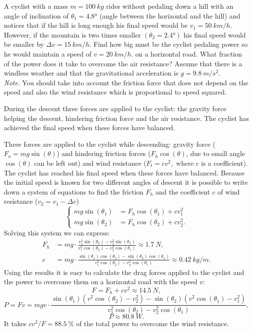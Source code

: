 A cyclist with a mass $m=\SI{100}{kg}$ rides without pedaling down a hill with an angle of inclination of $\theta_{1}=\ang{4.8}$ (angle between the horizontal and the hill) and notices that if the hill is long enough his final speed would be $v_{1}=\SI{50}{km/h}$. However, if the mountain is two times smaller $(\theta_{2}=\ang{2.4})$ his final speed would be smaller by $\Delta v=\SI{15}{km/h}$. Find how big must be the cyclist pedaling power so he would maintain a speed of $v=\SI{20}{km/h}.$ on a horizontal road. What fraction of the power does it take to overcome the air resistance? Assume that there is a windless weather and that the gravitational acceleration is $g=\SI{9.8}{m/s^{2}}$. \\
\emph{Note.} You should take into account the friction force that does not depend on the speed and also the wind resistance which is proportional to speed squared.

\hinteng
During the descent three forces are applied to the cyclist: the gravity force helping the descent, hindering friction force and the air resistance. The cyclist has achieved the final speed when these forces have balanced.

\solueng
Three forces are applied to the cyclist while descending: gravity force ($F_{a}=mg\sin(\theta)$) and hindering friction forces ($F_{h}\cos(\theta)$, due to small angle $\cos(\theta)$ can be left out) and wind resistance ($F_{t}=cv^{2},$ where $c$ is a coefficient). The cyclist has reached his final speed when these forces have balanced. Because the initial speed is known for two different angles of descent it is possible to write down a system of equations to find the friction $F_{h}$ and the coefficient $c$ of wind resistance ($v_{2}=v_{1}-\Delta v$)
\[
\begin{cases}
mg\sin(\theta_{1})&=F_{h}\cos(\theta_1)+cv_{1}^{2}\\
mg\sin(\theta_{2})&=F_{h}\cos(\theta_2)+cv_{2}^{2}.
\end{cases}
\] 
Solving this system we can express:
\begin{align*}
F_{h} & = mg\cdot\frac{v_{1}^{2}\sin(\theta_{2})-v_{2}^{2}\sin(\theta_{1})}{v_{1}^{2}\cos(\theta_2)-v_{2}^{2}\cos(\theta_1)}\approx\SI{1.7}{N},\\[7pt] 
c & = mg\cdot\frac{\sin(\theta_{1})\cos(\theta_2)-\sin(\theta_{2})\cos(\theta_1)}{v_{1}^{2}\cos(\theta_2)-v_{2}^{2}\cos(\theta_1)}\approx\SI{0.42}{kg/m}.
\end{align*} 
Using the results it is easy to calculate the drag forces applied to the cyclist and the power to overcome them on a horizontal road with the speed $v$:
\[
F=F_{h}+cv^{2}\approx\SI{14.5}{N},
\] 
\[
P=Fv=mgv\cdot\frac{\sin(\theta_{1})\left(v^{2}\cos(\theta_2)-v_{2}^{2}\right)-\sin(\theta_{2})\left(v^{2}\cos(\theta_1)-v_{1}^{2}\right)}{v_{1}^{2}\cos(\theta_2)-v_{2}^{2}\cos(\theta_1)},
\]
\[
P\approx\SI{80.8}{W}.
\]
It takes $cv^{2}/F=\SI{88.5}{\percent}$ of the total power to overcome the wind resistance.
\probend